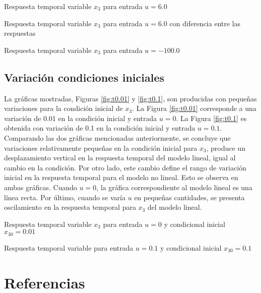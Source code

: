 \documentclass{ieeeaccess}
\begin{document}
       {Respuesta temporal variable $x_3$ para entrada $u=6.0$\label{fig:u6}}

       {Respuesta temporal variable $x_3$ para entrada $u=6.0$ con diferencia entre las respuestas\label{fig:u6dif}}

       {Respuesta temporal variable $x_3$ para entrada $u=-100.0$\label{fig:u-100}}
       
\subsection{Variación condiciones iniciales}
La gráficas mostradas, Figuras \ref{fig:t0.01} y \ref{fig:t0.1}, son producidas con pequeñas variaciones para la condición inicial de $x_3$. La Figura \ref{fig:t0.01} corresponde a una variación de 0.01 en la condición inicial y entrada $u=0$. La Figura \ref{fig:t0.1} es obtenida con variación de 0.1 en la condición inicial y entrada $u=0.1$. Comparando las dos gráficas mencionadas anteriormente, se concluye que variaciones relativamente pequeñas en la condición inicial para $x_3$, produce un desplazamiento vertical en la respuesta temporal del modelo lineal, igual al cambio en la condición. Por otro lado, este cambio define el rango de variación inicial en la respuesta temporal para el modelo no lineal. Esto se observa en ambas gráficas. Cuando $u=0$, la gráfica correspondiente al modelo lineal es una línea recta. Por último, cuando se varía $u$ en pequeñas cantidades, se presenta oscilamiento en la respuesta temporal para $x_3$ del modelo lineal.

       {Respuesta temporal variable $x_3$ para entrada $u=0$ y condicional inicial $x_{30}=0.01$\label{fig:t0.01}}
       
       {Respuesta temporal variable para entrada $u=0.1$ y condicional inicial $x_{30}=0.1$\label{fig:t0.1}}

\newpage
\section{Referencias}


\end{document}
